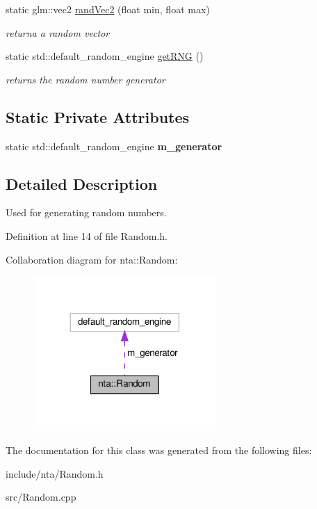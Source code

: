 \begin{DoxyCompactItemize}
static glm\+::vec2 \hyperlink{classnta_1_1Random_ac4fdaa10f7d4646d4489933b48aca148}{rand\+Vec2} (float min, float max)
\begin{DoxyCompactList}\small\item\em returna a random vector \end{DoxyCompactList}\item 
\mbox{\label{classnta_1_1Random_a70719bc927413d2df83593c243499c88}} 
static std\+::default\+\_\+random\+\_\+engine \hyperlink{classnta_1_1Random_a70719bc927413d2df83593c243499c88}{get\+R\+NG} ()
\begin{DoxyCompactList}\small\item\em returns the random number generator \end{DoxyCompactList}\end{DoxyCompactItemize}
\subsection*{Static Private Attributes}
\begin{DoxyCompactItemize}
\item 
\mbox{\label{classnta_1_1Random_ae9a96e05f269c06af6c8dda212dae11a}} 
static std\+::default\+\_\+random\+\_\+engine {\bfseries m\+\_\+generator}
\end{DoxyCompactItemize}


\subsection{Detailed Description}
Used for generating random numbers. 

Definition at line 14 of file Random.\+h.



Collaboration diagram for nta\+:\+:Random\+:
\nopagebreak
\begin{figure}[H]
\begin{center}
\leavevmode
\includegraphics[width=197pt]{de/dda/classnta_1_1Random__coll__graph}
\end{center}
\end{figure}


The documentation for this class was generated from the following files\+:\begin{DoxyCompactItemize}
\item 
include/nta/Random.\+h\item 
src/Random.\+cpp\end{DoxyCompactItemize}
